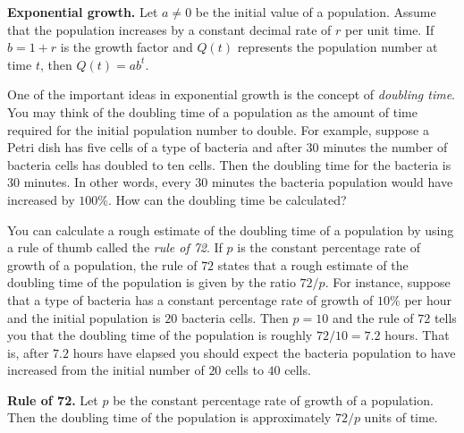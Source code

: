 \documentclass[a4paper,oneside,12pt]{article}
\begin{document}
\begin{theorem}
\label{thm:exponential:exponential_growth}
\textbf{Exponential growth.}
Let $a \neq 0$ be the initial value of a population.  Assume that the
population increases by a constant decimal rate of $r$ per unit time.
If $b = 1 + r$ is the growth factor and $Q(t)$ represents the
population number at time $t$, then $Q(t) = ab^t$.
\end{theorem}

One of the important ideas in exponential growth is the concept of
\emph{doubling time}.  You may think of the doubling time of a
population as the amount of time required for the initial population
number to double.  For example, suppose a Petri dish has five cells of
a type of bacteria and after $30$ minutes the number of bacteria cells
has doubled to ten cells.  Then the doubling time for the bacteria is
$30$ minutes.  In other words, every $30$ minutes the bacteria
population would have increased by $100\%$.  How can the doubling time
be calculated?

You can calculate a rough estimate of the doubling time of a
population by using a rule of thumb called the \emph{rule of 72}.  If
$p$ is the constant percentage rate of growth of a population, the
rule of $72$ states that a rough estimate of the doubling time of the
population is given by the ratio $72 / p$.  For instance, suppose that
a type of bacteria has a constant percentage rate of growth of $10\%$ per
hour and the initial population is $20$ bacteria cells.  Then $p = 10$
and the rule of $72$ tells you that the doubling time of the
population is roughly $72 / 10 = 7.2$ hours.  That is, after $7.2$
hours have elapsed you should expect the bacteria population to have
increased from the initial number of $20$ cells to $40$ cells.

\begin{theorem}
\textbf{Rule of 72.}
Let $p$ be the constant percentage rate of growth of a population.
Then the doubling time of the population is approximately $72 / p$
units of time.
\end{theorem}
\end{document}
